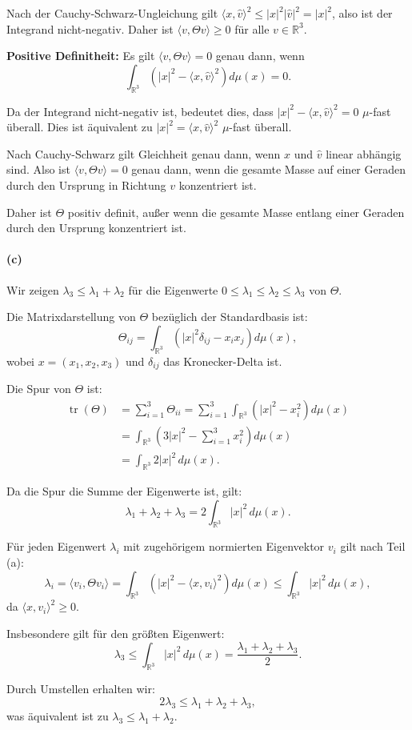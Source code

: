 \documentclass{article}
\newcommand{\R}{\mathbb{R}}
\DeclareMathOperator{\tr}{tr}
\begin{document}
Nach der Cauchy-Schwarz-Ungleichung gilt $\langle x, \hat{v}\rangle^2 \leq |x|^2 |\hat{v}|^2 = |x|^2$, also ist der Integrand nicht-negativ. Daher ist $\langle v, \Theta v \rangle \geq 0$ für alle $v \in \R^3$.

\textbf{Positive Definitheit:} Es gilt $\langle v, \Theta v \rangle = 0$ genau dann, wenn
$$\int_{\R^3} \left( |x|^2 - \langle x, \hat{v}\rangle^2 \right) d\mu(x) = 0.$$

Da der Integrand nicht-negativ ist, bedeutet dies, dass $|x|^2 - \langle x, \hat{v}\rangle^2 = 0$ $\mu$-fast überall. Dies ist äquivalent zu $|x|^2 = \langle x, \hat{v}\rangle^2$ $\mu$-fast überall.

Nach Cauchy-Schwarz gilt Gleichheit genau dann, wenn $x$ und $\hat{v}$ linear abhängig sind. Also ist $\langle v, \Theta v \rangle = 0$ genau dann, wenn die gesamte Masse auf einer Geraden durch den Ursprung in Richtung $v$ konzentriert ist.

Daher ist $\Theta$ positiv definit, außer wenn die gesamte Masse entlang einer Geraden durch den Ursprung konzentriert ist.

\paragraph{(c)} Wir zeigen $\lambda_3 \leq \lambda_1 + \lambda_2$ für die Eigenwerte $0 \leq \lambda_1 \leq \lambda_2 \leq \lambda_3$ von $\Theta$.

Die Matrixdarstellung von $\Theta$ bezüglich der Standardbasis ist:
$$\Theta_{ij} = \int_{\R^3} \left( |x|^2 \delta_{ij} - x_i x_j \right) d\mu(x),$$
wobei $x = (x_1, x_2, x_3)$ und $\delta_{ij}$ das Kronecker-Delta ist.

Die Spur von $\Theta$ ist:
\begin{align}
\tr(\Theta) &= \sum_{i=1}^3 \Theta_{ii} = \sum_{i=1}^3 \int_{\R^3} \left( |x|^2 - x_i^2 \right) d\mu(x)\\
&= \int_{\R^3} \left( 3|x|^2 - \sum_{i=1}^3 x_i^2 \right) d\mu(x)\\
&= \int_{\R^3} 2|x|^2 \, d\mu(x).
\end{align}

Da die Spur die Summe der Eigenwerte ist, gilt:
$$\lambda_1 + \lambda_2 + \lambda_3 = 2\int_{\R^3} |x|^2 \, d\mu(x).$$

Für jeden Eigenwert $\lambda_i$ mit zugehörigem normierten Eigenvektor $v_i$ gilt nach Teil (a):
$$\lambda_i = \langle v_i, \Theta v_i \rangle = \int_{\R^3} \left( |x|^2 - \langle x, v_i\rangle^2 \right) d\mu(x) \leq \int_{\R^3} |x|^2 \, d\mu(x),$$
da $\langle x, v_i\rangle^2 \geq 0$.

Insbesondere gilt für den größten Eigenwert:
$$\lambda_3 \leq \int_{\R^3} |x|^2 \, d\mu(x) = \frac{\lambda_1 + \lambda_2 + \lambda_3}{2}.$$

Durch Umstellen erhalten wir:
$$2\lambda_3 \leq \lambda_1 + \lambda_2 + \lambda_3,$$
was äquivalent ist zu $\lambda_3 \leq \lambda_1 + \lambda_2$.
\end{document}
